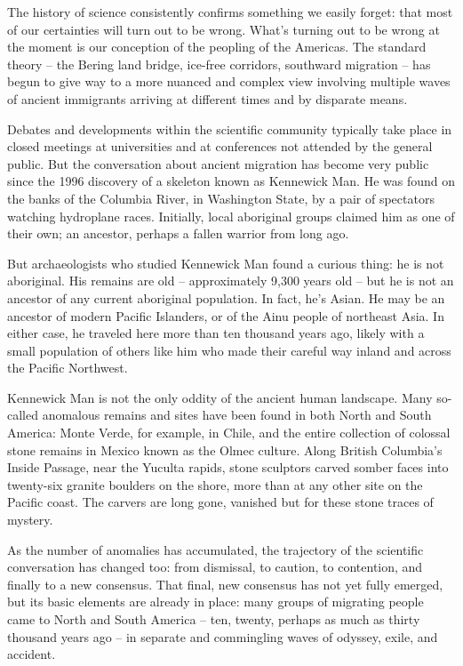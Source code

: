 \documentclass[letterpaper,10pt,headsepline]{scrreprt}
\begin{document}
The history of science consistently confirms something we easily
forget: that most of our certainties will turn out to be wrong. What's
turning out to be wrong at the moment is our conception of the
peopling of the Americas. The standard theory -- the Bering land
bridge, ice-free corridors, southward migration -- has begun to give
way to a more nuanced and complex view involving multiple waves of
ancient immigrants arriving at different times and by disparate means.

Debates and developments within the scientific community typically
take place in closed meetings at universities and at conferences not
attended by the general public. But the conversation about ancient
migration has become very public since the 1996 discovery of a
skeleton known as Kennewick Man. He was found on the banks of the
Columbia River, in Washington State, by a pair of spectators watching
hydroplane races. Initially, local aboriginal groups claimed him as
one of their own; an ancestor, perhaps a fallen warrior from long ago.

But archaeologists who studied Kennewick Man found a curious thing: he
is not aboriginal. His remains are old -- approximately 9,300 years
old -- but he is not an ancestor of any current aboriginal population.
In fact, he's Asian. He may be an ancestor of modern Pacific
Islanders, or of the Ainu people of northeast Asia. In either case, he
traveled here more than ten thousand years ago, likely with a small
population of others like him who made their careful way inland and
across the Pacific Northwest.

Kennewick Man is not the only oddity of the ancient human landscape.
Many so-called anomalous remains and sites have been found in both
North and South America: Monte Verde, for example, in Chile, and the
entire collection of colossal stone remains in Mexico known as the
Olmec culture. Along British Columbia's Inside Passage, near the
Yuculta rapids, stone sculptors carved somber faces into twenty-six
granite boulders on the shore, more than at any other site on the
Pacific coast. The carvers are long gone, vanished but for these stone
traces of mystery.

As the number of anomalies has accumulated, the trajectory of the
scientific conversation has changed too: from dismissal, to caution,
to contention, and finally to a new consensus. That final, new
consensus has not yet fully emerged, but its basic elements are
already in place: many groups of migrating people came to North and
South America -- ten, twenty, perhaps as much as thirty thousand years
ago -- in separate and commingling waves of odyssey, exile, and
accident.
\end{document}
